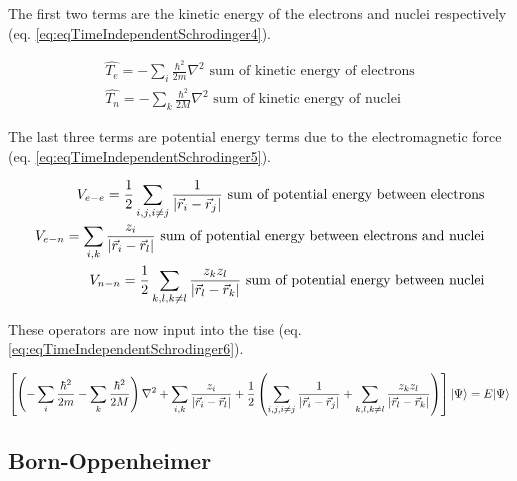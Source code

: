 The first two terms are the kinetic energy of the electrons and nuclei respectively (eq. \ref{eq:eqTimeIndependentSchrodinger4}).

\begin{equation}
\begin{split}
\hat{T_e} = - \sum_{i} \frac{\hbar^2}{2 m}  \nabla^2 \text{  sum of kinetic energy of electrons} \\
\hat{T_n} = - \sum_{k} \frac{\hbar^2}{2 M}  \nabla^2 \text{  sum of kinetic energy of nuclei}
\end{split}
\label{eq:eqTimeIndependentSchrodinger4}
\end{equation}

The last three terms are potential energy terms due to the electromagnetic force (eq. \ref{eq:eqTimeIndependentSchrodinger5}). 

\begin{equation}
\begin{split}
V_{e-e} = \frac{1}{2} \sum_{i,j,i \neq j} \frac{1}{\abs{\vec{r}_i - \vec{r}_j}} \text{  sum of potential energy between electrons} \\
V_{e-n} = \sum_{i,k} \frac{z_i}{\abs{\vec{r}_i - \vec{r}_l}} \text{  sum of potential energy between electrons and nuclei} \\
V_{n-n} = \frac{1}{2} \sum_{k,l,k \neq l} \frac{z_k z_l}{\abs{\vec{r}_l - \vec{r}_k}} \text{  sum of potential energy between nuclei}
\end{split}
\label{eq:eqTimeIndependentSchrodinger5}
\end{equation}

These operators are now input into the \acrshort{tise} (eq. \ref{eq:eqTimeIndependentSchrodinger6}).


\begin{equation}
\begin{split}
\left[ \left(- \sum_{i} \frac{\hbar^2}{2 m} - \sum_{k} \frac{\hbar^2}{2 M} \right) \nabla^2  + \sum_{i,k} \frac{z_i}{\abs{\vec{r}_i - \vec{r}_l}} + \frac{1}{2} \left( \sum_{i,j,i \neq j} \frac{1}{\abs{\vec{r}_i - \vec{r}_j}} + \sum_{k,l,k \neq l} \frac{z_k z_l}{\abs{\vec{r}_l - \vec{r}_k}} \right) \right] \lvert \Psi \rangle = E \lvert \Psi \rangle
\end{split}
\label{eq:eqTimeIndependentSchrodinger6}
\end{equation}



\subsection{Born-Oppenheimer}

